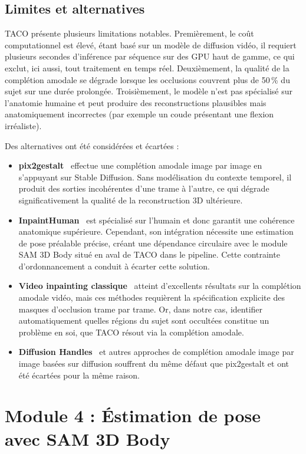 \subsection{Limites et alternatives}

TACO présente plusieurs limitations notables. Premièrement, le coût computationnel est élevé, étant basé sur un modèle de diffusion vidéo, il requiert plusieurs secondes d'inférence par séquence sur des GPU haut de gamme, ce qui exclut, ici aussi, tout traitement en temps réel. Deuxièmement, la qualité de la complétion amodale se dégrade lorsque les occlusions couvrent plus de 50\,\% du sujet sur une durée prolongée. Troisièmement, le modèle n'est pas spécialisé sur l'anatomie humaine et peut produire des reconstructions plausibles mais anatomiquement incorrectes (par exemple un coude présentant une flexion irréaliste).

Des alternatives ont été considérées et écartées :
\begin{itemize}
  \item \textbf{pix2gestalt}~\cite{pix2gestalt-2024} effectue une complétion amodale image par image en s'appuyant sur Stable Diffusion. Sans modélisation du contexte temporel, il produit des sorties incohérentes d'une trame à l'autre, ce qui dégrade significativement la qualité de la reconstruction 3D ultérieure.
  \item \textbf{InpaintHuman}~\cite{InpaintHuman-2026} est spécialisé sur l'humain et donc garantit une cohérence anatomique supérieure. Cependant, son intégration nécessite une estimation de pose préalable précise, créant une dépendance circulaire avec le module SAM 3D Body situé en aval de TACO dans le pipeline. Cette contrainte d'ordonnancement a conduit à écarter cette solution.
  \item \textbf{Video inpainting classique}~\cite{ProPainter-2023} atteint d'excellents résultats sur la complétion amodale vidéo, mais ces méthodes requièrent la spécification explicite des masques d'occlusion trame par trame. Or, dans notre cas, identifier automatiquement quelles régions du sujet sont occultées constitue un problème en soi, que TACO résout via la complétion amodale.
  \item \textbf{Diffusion Handles}~\cite{DiffusionHandles-2023} et autres approches de complétion amodale image par image basées sur diffusion souffrent du même défaut que pix2gestalt et ont été écartées pour la même raison.
\end{itemize}


\section{Module 4 : Éstimation de pose avec SAM 3D Body}

